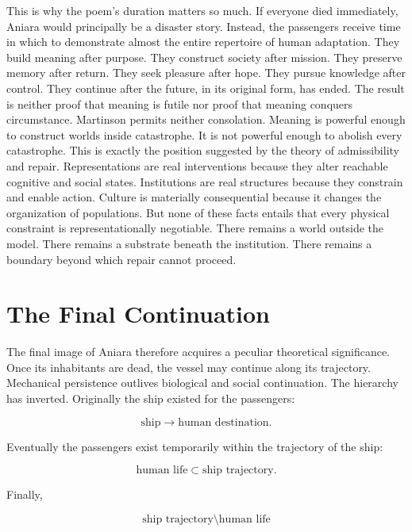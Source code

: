 \documentclass[11pt,oneside]{book}
\theoremstyle{definition}
\theoremstyle{remark}
\begin{document}
This is why the poem's duration matters so much. If everyone died immediately, Aniara would
principally be a disaster story. Instead, the passengers receive time in which to demonstrate almost
the entire repertoire of human adaptation. They build meaning after purpose. They construct society
after mission. They preserve memory after return. They seek pleasure after hope. They pursue
knowledge after control. They continue after the future, in its original form, has ended. The result
is neither proof that meaning is futile nor proof that meaning conquers circumstance. Martinson
permits neither consolation. Meaning is powerful enough to construct worlds inside catastrophe. It
is not powerful enough to abolish every catastrophe. This is exactly the position suggested by the
theory of admissibility and repair. Representations are real interventions because they alter
reachable cognitive and social states. Institutions are real structures because they constrain and
enable action. Culture is materially consequential because it changes the organization of
populations. But none of these facts entails that every physical constraint is representationally
negotiable. There remains a world outside the model. There remains a substrate beneath the
institution. There remains a boundary beyond which repair cannot proceed.

\section{The Final Continuation}

The final image of Aniara therefore acquires a peculiar theoretical significance. Once its
inhabitants are dead, the vessel may continue along its trajectory. Mechanical persistence outlives
biological and social continuation. The hierarchy has inverted. Originally the ship existed for the
passengers:

\[
\text{ship}\rightarrow\text{human destination}.
\]

Eventually the passengers exist temporarily within the trajectory of the ship:

\[
\text{human life}\subset\text{ship trajectory}.
\]

Finally,

\[
\text{ship trajectory} \setminus \text{human life}
\]
\end{document}
